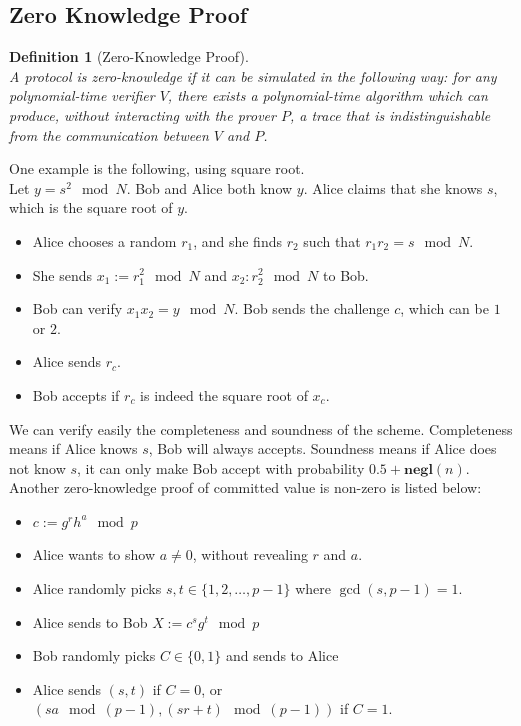 \documentclass[12pt]{article}
\newtheorem{definition}{Definition}[section]
\theoremstyle{definition}
\begin{document}
\subsection{Zero Knowledge Proof}
\begin{definition}[Zero-Knowledge Proof]
\hfill\\\normalfont A protocol is zero-knowledge if it can be simulated in the following way: for any polynomial-time verifier $V$, there exists a polynomial-time algorithm which can produce, without interacting with the prover $P$, a trace that is indistinguishable from the communication between $V$ and $P$.
\end{definition}
One example is the following, using square root.\\
Let $y=s^2\mod N$. Bob and Alice both know $y$. Alice claims that she knows $s$, which is the square root of $y$.\\
\begin{itemize}
  \item Alice chooses a random $r_1$, and she finds $r_2$ such that $r_1r_2=s\mod N$.
  \item She sends $x_1:=r_1^2\mod N$ and $x_2:r_2^2\mod N$ to Bob.
  \item Bob can verify $x_1x_2=y\mod N$. Bob sends the challenge $c$, which can be $1$ or $2$.
  \item Alice sends $r_c$.
  \item Bob accepts if $r_c$ is indeed the square root of $x_c$.
\end{itemize}
We can verify easily the completeness and soundness of the scheme. Completeness means if Alice knows $s$, Bob will always accepts. Soundness means if Alice does not know $s$, it can only make Bob accept with probability $0.5+\mathbf{negl}(n)$.\\
Another zero-knowledge proof of committed value is non-zero is listed below:
\begin{itemize}
  \item $c:=g^rh^a\mod p$
  \item Alice wants to show $a\neq 0$, without revealing $r$ and $a$.
  \item Alice randomly picks $s,t\in\{1,2,\ldots, p-1\}$ where $\gcd(s,p-1)=1$.
  \item Alice sends to Bob $X:=c^sg^t\mod p$
  \item Bob randomly picks $C\in\{0,1\}$ and sends to Alice
  \item Alice sends $(s,t)$ if $C=0$, or $(sa\mod (p-1), (sr+t)\mod (p-1))$ if $C=1$.
\end{itemize}
\end{document}
